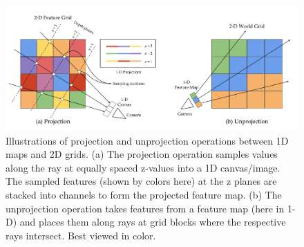 \begin{figure}
\includegraphics[width=0.95\linewidth]{figures/proj_unproj.pdf}
\caption{Illustrations of projection and unprojection operations between 1D maps and 2D grids. (a) The projection operation samples values along the ray at equally spaced z-values into a 1D canvas/image. The sampled features (shown by colors here) at the z planes are stacked into channels to form the projected feature map. (b) The unprojection operation takes features from a feature map (here in 1-D) and places them along rays at grid blocks where the respective rays intersect. Best viewed in color.}
\end{figure}